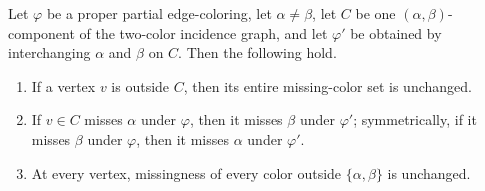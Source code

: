 \begin{helper}
Let \(\varphi\) be a proper partial edge-coloring, let
\(\alpha\ne\beta\), let \(C\) be one
\((\alpha,\beta)\)-component of the two-color incidence graph, and let
\(\varphi'\) be obtained by interchanging \(\alpha\) and \(\beta\) on
\(C\).  Then the following hold.
\begin{enumerate}
\item If a vertex \(v\) is outside \(C\), then its entire missing-color
set is unchanged.
\item If \(v\in C\) misses \(\alpha\) under \(\varphi\), then it misses
\(\beta\) under \(\varphi'\); symmetrically, if it misses \(\beta\)
under \(\varphi\), then it misses \(\alpha\) under \(\varphi'\).
\item At every vertex, missingness of every color outside
\(\{\alpha,\beta\}\) is unchanged.
\end{enumerate}
\end{helper}
